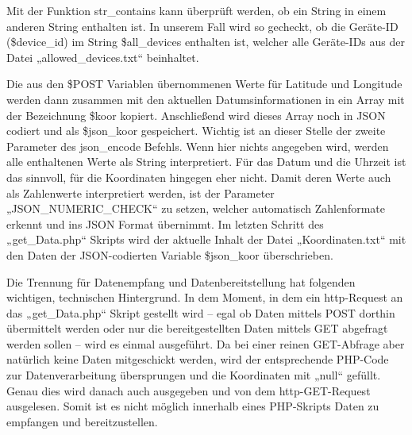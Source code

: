 Mit der Funktion str\_contains kann überprüft werden, ob ein String in einem anderen String enthalten ist. In unserem Fall wird so gecheckt, ob die Geräte-ID (\$device\_id) im String \$all\_devices enthalten ist, welcher alle Geräte-IDs aus der Datei „allowed\_devices.txt“ beinhaltet.

Die aus den \$POST Variablen übernommenen Werte für Latitude und Longitude werden dann zusammen mit den aktuellen Datumsinformationen in ein Array mit der Bezeichnung \$koor kopiert. Anschließend wird dieses Array noch in JSON codiert und als \$json\_koor gespeichert. Wichtig ist an dieser Stelle der zweite Parameter des json\_encode Befehls. Wenn hier nichts angegeben wird, werden alle enthaltenen Werte als String interpretiert. Für das Datum und die Uhrzeit ist das sinnvoll, für die Koordinaten hingegen eher nicht. Damit deren Werte auch als Zahlenwerte interpretiert werden, ist der Parameter „JSON\_NUMERIC\_CHECK“ zu setzen, welcher automatisch Zahlenformate erkennt und ins JSON Format übernimmt. Im letzten Schritt des „get\_Data.php“ Skripts wird der aktuelle Inhalt der Datei „Koordinaten.txt“ mit den Daten der JSON-codierten Variable \$json\_koor überschrieben.

Die Trennung für Datenempfang und Datenbereitstellung hat folgenden wichtigen, technischen Hintergrund. In dem Moment, in dem ein http-Request an das „get\_Data.php“ Skript gestellt wird – egal ob Daten mittels POST dorthin übermittelt werden oder nur die bereitgestellten Daten mittels GET abgefragt werden sollen – wird es einmal ausgeführt. Da bei einer reinen GET-Abfrage aber natürlich keine Daten mitgeschickt werden, wird der entsprechende PHP-Code zur Datenverarbeitung übersprungen und die Koordinaten mit „null“ gefüllt. Genau dies wird danach auch ausgegeben und von dem http-GET-Request ausgelesen. Somit ist es nicht möglich innerhalb eines PHP-Skripts Daten zu empfangen und bereitzustellen.

